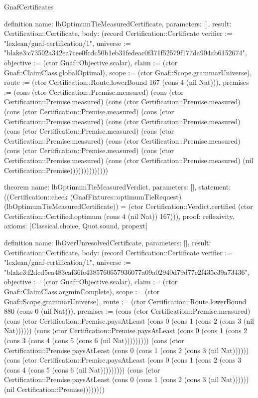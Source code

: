 \begin{lexlean}{GnafCertificates}
\begin{semanticmodule}
definition{
  name: lbOptimumTieMeasuredCertificate,
  parameters: [],
  result: Certification::Certificate,
  body: (record Certification::Certificate {verifier := "lexlean/gnaf-certification/1", universe := "blake3:c73592a342ea7cee0fcdc50b1eb31fedeac0f371f52579f177da904ab6152674", objective := (ctor Gnaf::Objective.scalar), claim := (ctor Gnaf::ClaimClass.globalOptimal), scope := (ctor Gnaf::Scope.grammarUniverse), route := (ctor Certification::Route.lowerBound 167 (cons 4 (nil Nat))), premises := (cons (ctor Certification::Premise.measured) (cons (ctor Certification::Premise.measured) (cons (ctor Certification::Premise.measured) (cons (ctor Certification::Premise.measured) (cons (ctor Certification::Premise.measured) (cons (ctor Certification::Premise.measured) (cons (ctor Certification::Premise.measured) (cons (ctor Certification::Premise.measured) (cons (ctor Certification::Premise.measured) (cons (ctor Certification::Premise.measured) (cons (ctor Certification::Premise.measured) (cons (ctor Certification::Premise.measured) (nil Certification::Premise)))))))))))))})
}

theorem{
  name: lbOptimumTieMeasuredVerdict,
  parameters: [],
  statement: ((Certification::check (GnafFixtures::optimumTieRequest) (lbOptimumTieMeasuredCertificate)) = (ctor Certification::Verdict.certified (ctor Certification::Certified.optimum (cons 4 (nil Nat)) 167))),
  proof: reflexivity{},
  axioms: [Classical.choice, Quot.sound, propext]
}

definition{
  name: lbOverUnresolvedCertificate,
  parameters: [],
  result: Certification::Certificate,
  body: (record Certification::Certificate {verifier := "lexlean/gnaf-certification/1", universe := "blake3:f2dcd5ea483eaf36fe4385760657936077a09a02940d79d77c2f435c39a73436", objective := (ctor Gnaf::Objective.scalar), claim := (ctor Gnaf::ClaimClass.argminComplete), scope := (ctor Gnaf::Scope.grammarUniverse), route := (ctor Certification::Route.lowerBound 880 (cons 0 (nil Nat))), premises := (cons (ctor Certification::Premise.measured) (cons (ctor Certification::Premise.paysAtLeast (cons 0 (cons 1 (cons 2 (cons 3 (nil Nat)))))) (cons (ctor Certification::Premise.paysAtLeast (cons 0 (cons 1 (cons 2 (cons 3 (cons 4 (cons 5 (cons 6 (nil Nat))))))))) (cons (ctor Certification::Premise.paysAtLeast (cons 0 (cons 1 (cons 2 (cons 3 (nil Nat)))))) (cons (ctor Certification::Premise.paysAtLeast (cons 0 (cons 1 (cons 2 (cons 3 (cons 4 (cons 5 (cons 6 (nil Nat))))))))) (cons (ctor Certification::Premise.paysAtLeast (cons 0 (cons 1 (cons 2 (cons 3 (nil Nat)))))) (nil Certification::Premise)))))))})
}


\end{semanticmodule}
\end{lexlean}
